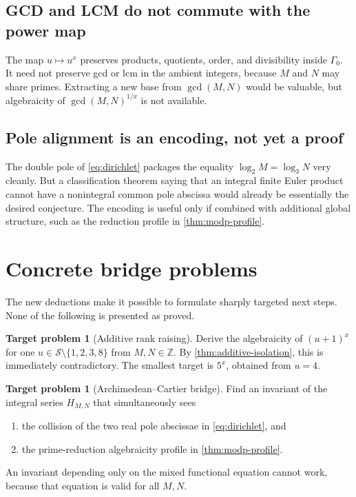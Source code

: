 \documentclass[11pt]{article}
\theoremstyle{definition}
\newtheorem{problem}[theorem]{Target problem}
\newcommand{\Z}{\mathbb{Z}}
\newcommand{\smooth}{\mathcal{S}}
\newcommand{\Gammao}{\Gamma_0}
\begin{document}
\subsection{GCD and LCM do not commute with the power map}

The map $u\mapsto u^x$ preserves products, quotients, order, and divisibility
inside $\Gammao$.  It need not preserve gcd or lcm in the ambient integers,
because $M$ and $N$ may share primes.  Extracting a new base from
$\gcd(M,N)$ would be valuable, but algebraicity of
$\gcd(M,N)^{1/x}$ is not available.

\subsection{Pole alignment is an encoding, not yet a proof}

The double pole of \cref{eq:dirichlet} packages the equality
$\log_2M=\log_3N$ very cleanly.  But a classification theorem saying that an
integral finite Euler product cannot have a nonintegral common pole abscissa
would already be essentially the desired conjecture.  The encoding is useful
only if combined with additional global structure, such as the reduction
profile in \cref{thm:modp-profile}.

\section{Concrete bridge problems}

The new deductions make it possible to formulate sharply targeted next steps.
None of the following is presented as proved.

\begin{problem}[Additive rank raising]
Derive the algebraicity of $(u+1)^x$ for one
$u\in\smooth\setminus\{1,2,3,8\}$ from $M,N\in\Z$.  By
\cref{thm:additive-isolation}, this is immediately contradictory.  The
smallest target is $5^x$, obtained from $u=4$.
\end{problem}

\begin{problem}[Archimedean--Cartier bridge]
Find an invariant of the integral series $H_{M,N}$ that simultaneously sees
\begin{enumerate}[label=\textup{(\roman*)}]
\item the collision of the two real pole abscissae in \cref{eq:dirichlet}, and
\item the prime-reduction algebraicity profile in \cref{thm:modp-profile}.
\end{enumerate}
An invariant depending only on the mixed functional equation cannot work,
because that equation is valid for all $M,N$.
\end{problem}
\end{document}
